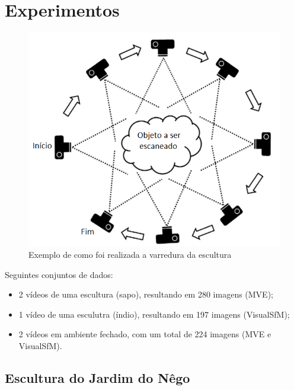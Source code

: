 \documentclass[table, usenames, svgnames, xcolor=dvipsnames]{beamer}
\begin{document}
\section{Experimentos}

\begin{frame}
	\begin{figure}
	\centering
	\includegraphics[width=0.7\linewidth]{figs/procedimentoscan.png}
	\caption{%
	Exemplo de como foi realizada a varredura da escultura
	}
\end{figure}

\end{frame}

\begin{frame}
	Seguintes conjuntos de dados:
	\begin{center}
		\begin{itemize}
			\item 2 vídeos de uma escultura (sapo), resultando em 280 imagens (MVE);
			\item 1 vídeo de uma esculutra (índio), resultando em 197 imagens (VisualSfM);
			\item 2 vídeos em ambiente fechado, com um total de 224 imagens (MVE e VisualSfM).
		\end{itemize}
	\end{center}
\end{frame}

\subsection{Escultura do Jardim do Nêgo}
\end{document}
